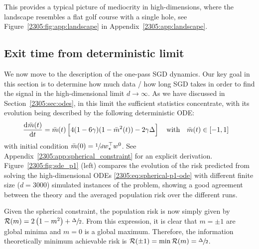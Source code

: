 This provides a typical picture of mediocrity in high-dimensions, where the landscape resembles a flat golf course with a single hole, see Figure~\ref{2305:fig:app:landscape} in Appendix~\ref{2305:app:landscape}.

\subsection{Exit time from deterministic limit}
\label{2305:sec:exit:deterministic}
We now move to the description of the one-pass SGD dynamics. Our key goal in this section is to determine how much data / how long SGD takes in order to find the signal in the high-dimensional limit $d\to\infty$. As we have discussed in Section~\ref{2305:sec:odes}, in this limit the sufficient statistics concentrate, with its evolution being described by the following deterministic ODE:
\begin{align} \label{2305:eq:spherical-p1-ode}
  \dod{\bar{m}{(t)}}{t} &= \bar{m}{(t)}\left[4(1-6\gamma)(1-\bar{m}^2{(t)})-2\gamma\Delta\right]\quad\text{with}\quad
  \bar{m}(t)\in[-1,1]
\end{align}
 with initial condition $\bar{m}(0)=\sfrac{1}{d}w_{\star}^{\top}w^{0}$. See Appendix~\ref{2305:app:spherical_constraint} for an explicit derivation. Figure~\ref{2305:fig:sde_p1} (left) compares the evolution of the risk predicted from solving the high-dimensional ODEs \eqref{2305:eq:spherical-p1-ode} with different finite size ($d=3000$) simulated instances of the problem, showing a good agreement between the theory and the averaged population risk over the different runs. 

Given the spherical constraint, the population risk is now simply given by $\mathcal{R}{(m)} = 2 \left(1-m^2\right)+\sfrac{\Delta}{2}$. From this expression, it is clear that $m=\pm 1$ are global minima and $m=0$ is a global maximum. Therefore, the information theoretically minimum achievable risk is $\mathcal{R}(\pm 1) = \min \mathcal{R}(m) = \sfrac{\Delta}{2}$. 

